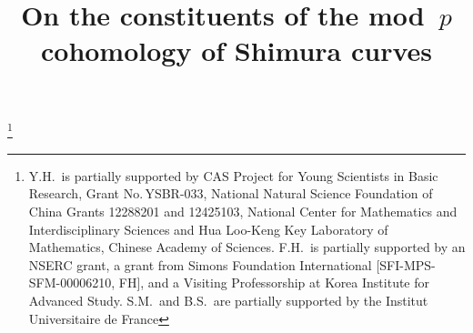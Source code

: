 \documentclass[JEP,XML,SOM,Unicode,NoFloatCountersInSection, NoEqCountersInSection,published]{cedram}
\theoremstyle{plain}
\theoremstyle{definition}
\begin{document}
\frontmatter
\title{On the constituents of the mod~$p$ cohomology of Shimura curves}

\author[\initial{C.} \lastname{Breuil}]{ }
\address{CNRS, Bâtiment 307, Faculté d'Orsay, Université Paris-Saclay,\\ 91405 Orsay Cedex, France}

\author[\initial{F.} \lastname{Herzig}]{ }
\address{Dept.\ of Math., Univ.\ of Toronto,\\
40 St.\ George St., BA6290, Toronto, ON M5S 2E4, Canada}

\author[\initial{Y.} \lastname{Hu}]{ }
\address{Morningside Center of Mathematics, Academy of Mathematics and Systems Science, Chinese Academy of Sciences,\\
Beijing 100190, China}

\author[\initial{S.} \lastname{Morra}]{ }
\address{Lab.\ d'Analyse, Géométrie, Algèbre,\\
99 Av.\ Jean Baptiste Clément, 93430 Villetaneuse, France\\
\& Institut Universitaire de France (IUF)}

\author[\initial{B.} \lastname{Schraen}]{ }
\address{Institut Camille Jordan, Université Claude Bernard Lyon I,\\
69622 Villeurbanne, France\\
\& Institut Universitaire de France (IUF)}

\thanks{Y.H.\ is partially supported by CAS Project for Young Scientists in Basic Research, Grant No.\,YSBR-033, National Natural Science Foundation of China Grants 12288201 and 12425103, National Center for Mathematics and Interdisciplinary Sciences and Hua Loo-Keng Key Laboratory of Mathematics, Chinese Academy of Sciences. F.H.\ is partially supported by an NSERC grant, a grant from Simons Foundation International [SFI-MPS-SFM-00006210, FH], and a Visiting Professorship at Korea Institute for Advanced Study. S.M.\ and B.S.\ are partially supported by the Institut Universitaire de France}
\end{document}
